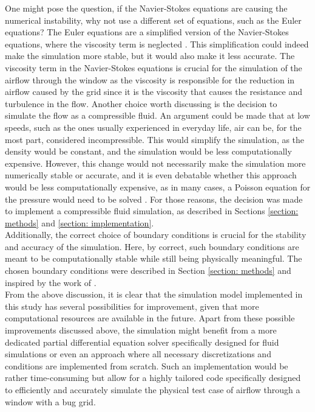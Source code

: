 One might pose the question, if the Navier-Stokes equations are causing the numerical instability, why not use a different set of equations, such as the Euler equations? The Euler equations are a simplified version of the Navier-Stokes equations, where the viscosity term is neglected \cite{eulerEqs}. This simplification could indeed make the simulation more stable, but it would also make it less accurate. The viscosity term in the Navier-Stokes equations is crucial for the simulation of the airflow through the window as the viscosity is responsible for the reduction in airflow caused by the grid since it is the viscosity that causes the resistance and turbulence in the flow. Another choice worth discussing is the decision to simulate the flow as a compressible fluid. An argument could be made that at low speeds, such as the ones usually experienced in everyday life, air can be, for the most part, considered incompressible. This would simplify the simulation, as the density would be constant, and the simulation would be less computationally expensive. However, this change would not necessarily make the simulation more numerically stable or accurate, and it is even debatable whether this approach would be less computationally expensive, as in many cases, a Poisson equation for the pressure would need to be solved \cite{incompressible}. For those reasons, the decision was made to implement a compressible fluid simulation, as described in Sections \ref{section: methods} and \ref{section: implementation}. \\

Additionally, the correct choice of boundary conditions is crucial for the stability and accuracy of the simulation. Here, by correct, such boundary conditions are meant to be computationally stable while still being physically meaningful. The chosen boundary conditions were described in Section \ref{section: methods} and inspired by the work of \cite{cfdBarbs}. \\

From the above discussion, it is clear that the simulation model implemented in this study has several possibilities for improvement, given that more computational resources are available in the future. Apart from these possible improvements discussed above, the simulation might benefit from a more dedicated partial differential equation solver specifically designed for fluid simulations or even an approach where all necessary discretizations and conditions are implemented from scratch. Such an implementation would be rather time-consuming but allow for a highly tailored code specifically designed to efficiently and accurately simulate the physical test case of airflow through a window with a bug grid. \\